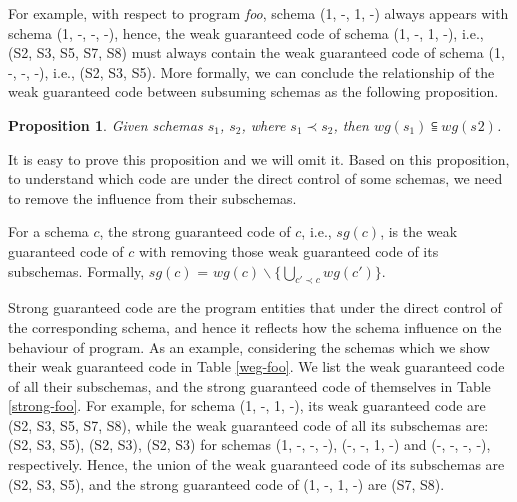 \documentclass{sig-alternate-05-2015}
\begin{document}
For example, with respect to program \emph{foo}, schema (1, -, 1, -) always appears with schema (1, -, -, -), hence, the weak  guaranteed code of schema (1, -, 1, -), i.e., (S2, S3, S5, S7, S8) must always contain the weak guaranteed code of schema (1, -, -, -), i.e., (S2, S3, S5).
More formally, we can conclude the relationship of the weak guaranteed code between subsuming schemas as the following proposition.

\newtheorem{proposition}{Proposition}
\begin{proposition}
Given schemas $s_{1}$, $s_{2}$, where $s_{1} \prec s_{2}$, then $wg(s_{1}) \subseteqq wg(s_{}2)$.
\end{proposition}

It is easy to prove this proposition and we will omit it. Based on this proposition, to understand which code are under the direct control of some schemas, we need to remove the influence from their subschemas.

\begin{definition}
For a schema $c$, the strong guaranteed code of $c$, i.e., $sg(c)$, is the weak guaranteed code of $c$ with removing those weak guaranteed code of its subschemas. Formally, $sg(c)$ = $wg(c) \backslash \{\bigcup_{c' \prec c} wg(c') \}$.

\end{definition}

Strong guaranteed code are the program entities that under the direct control of the corresponding schema, and hence it reflects how the schema influence on the behaviour of program. As an example, considering the schemas which we show their weak guaranteed code in Table \ref{weg-foo}. We list the weak guaranteed code of all their subschemas, and the strong guaranteed code of themselves in Table \ref{strong-foo}. For example, for schema (1, -, 1, -), its weak guaranteed code are (S2, S3, S5, S7, S8), while the weak guaranteed code of all its subschemas are: (S2, S3, S5), (S2, S3), (S2, S3) for schemas (1, -, -, -), (-, -, 1, -) and (-, -, -, -), respectively. Hence, the union of the weak guaranteed code of its subschemas are (S2, S3, S5), and the strong guaranteed code of (1, -, 1, -) are (S7, S8).
\end{document}
